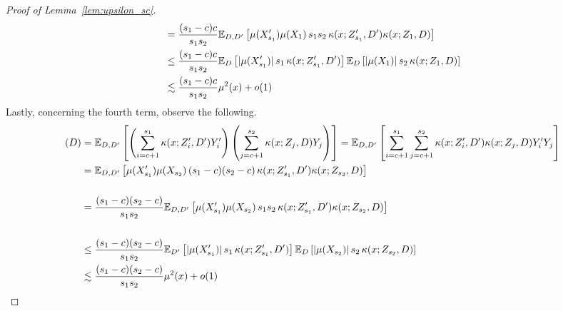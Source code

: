\begin{proof}[Proof of Lemma~\ref{lem:upsilon_sc}]
\begin{equation}
\begin{aligned}
			 & = \frac{(s_1 - c)c}{s_1 s_2}\mathbb{E}_{D, D^{\prime}}\left[\mu(X_{s_1}^{\prime})\mu(X_1) \, s_1 s_2 \, \kappa(x; Z_{s_1}^{\prime}, D^{\prime})\kappa(x; Z_1, D)\right] \\
			 & \leq \frac{(s_1 - c)c}{s_1 s_2}
			\mathbb{E}_{D}\left[|\mu(X_{s_1}^{\prime})| \, s_1 \, \kappa(x; Z_{s_1}^{\prime}, D^{\prime})\right]
			\mathbb{E}_{D}\left[|\mu(X_1)| \, s_2 \, \kappa(x; Z_1, D)\right]                                                                                                                             \\
			 & \lesssim \frac{(s_1 - c)c}{s_1 s_2} \mu^2(x) + o(1)
		\end{aligned}
	\end{equation}
	Lastly, concerning the fourth term, observe the following.
	\begin{equation}
		\begin{aligned}
			(D)
			 & = \mathbb{E}_{D, D^{\prime}}\left[\left(\sum_{i = c+1}^{s_1}\kappa(x; Z_{i}^{\prime}, D^{\prime}) Y_{i}^{\prime}\right)
				\left(\sum_{j = c+1}^{s_2} \kappa(x; Z_{j}, D) Y_j\right)\right]
			= \mathbb{E}_{D, D^{\prime}}\left[\sum_{i = c+1}^{s_1}\sum_{j = c+1}^{s_2}\kappa(x; Z_{i}^{\prime}, D^{\prime}) \kappa(x; Z_{j}, D)  Y_{i}^{\prime}Y_j\right]                                                        \\
			 & = \mathbb{E}_{D, D^{\prime}}\left[\mu(X_{s_1}^{\prime}) \mu(X_{s_2}) \, (s_1 - c)(s_2 -c) \,\kappa(x; Z_{s_1}^{\prime}, D^{\prime}) \kappa(x; Z_{s_2}, D)  \right]                        \\                                                                                                                                                                       \\
			 & = \frac{(s_1 - c)(s_2 -c)}{s_1 s_2}\mathbb{E}_{D, D^{\prime}}\left[\mu(X_{s_1}^{\prime}) \mu(X_{s_2}) \, s_1 s_2 \,\kappa(x; Z_{s_1}^{\prime}, D^{\prime}) \kappa(x; Z_{s_2}, D)  \right] \\                                                                                                                                                                       \\
			 & \leq \frac{(s_1 - c)(s_2 -c)}{s_1 s_2}
			\mathbb{E}_{D^{\prime}}\left[|\mu(X_{s_1}^{\prime})| \, s_1 \,\kappa(x; Z_{s_1}^{\prime}, D^{\prime})   \right]
			\mathbb{E}_{D}\left[ |\mu(X_{s_2})| \, s_2 \, \kappa(x; Z_{s_2}, D)  \right]                                                                                                                                    \\
			 & \lesssim \frac{(s_1 - c)(s_2 -c)}{s_1 s_2}\mu^2(x) + o(1)
		\end{aligned}
	\end{equation}
\end{proof}


